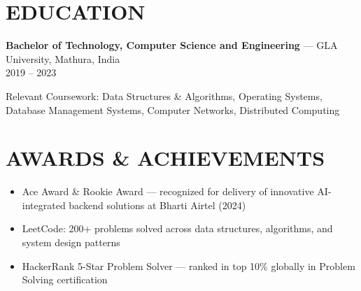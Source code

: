 \documentclass[10.5pt,letterpaper]{article}
\newenvironment{bul}{\begin{itemize}[leftmargin=2.2em,itemsep=1pt,topsep=1pt,parsep=0pt,label=\textbullet]}{\end{itemize}}
\begin{document}
\section{EDUCATION}
\textbf{Bachelor of Technology, Computer Science and Engineering} \hspace{0.3em}---\hspace{0.3em} GLA University, Mathura, India\\[-1pt]
{\color{greytxt}\small 2019 -- 2023}\par\vspace{1pt}
Relevant Coursework: Data Structures \& Algorithms, Operating Systems, Database Management Systems, Computer Networks, Distributed Computing

\section{AWARDS \& ACHIEVEMENTS}
\begin{bul}
\item Ace Award \& Rookie Award --- recognized for delivery of innovative AI-integrated backend solutions at Bharti Airtel (2024)
\item LeetCode: 200+ problems solved across data structures, algorithms, and system design patterns
\item HackerRank 5-Star Problem Solver --- ranked in top 10\% globally in Problem Solving certification
\end{bul}
\end{document}
